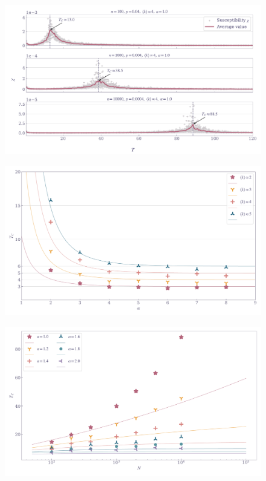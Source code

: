 \documentclass[11pt,a4paper]{article}
\begin{document}
\begin{figure}[ht!]
    \includegraphics[width=\linewidth]{../figures/suscept_ER_single.pdf}
\end{figure}

\begin{figure}[ht!]
    \includegraphics[width=\linewidth]{../figures/TC_vs_alpha.pdf}
\end{figure}

\begin{figure}[ht!]
    \includegraphics[width=\linewidth]{../figures/TC_vs_size.pdf}
\end{figure}
\end{document}
